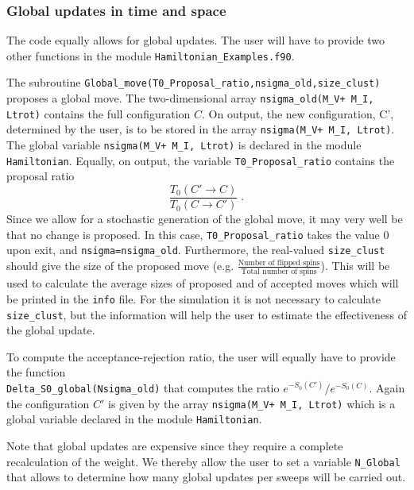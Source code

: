\subsubsection{Global updates in time and space}
%  
The code equally allows for global updates.  The user will have to provide two other functions in the module \texttt{Hamiltonian\_Examples.f90}.   


The subroutine  \texttt{Global\_move(T0\_Proposal\_ratio,nsigma\_old,size\_clust)}  proposes  a global move. 
The two-dimensional array \texttt{nsigma\_old(M\_V+ M\_I, Ltrot)}  contains  the full  configuration $C$.  On output, the new configuration,   C', determined by the user,  is to be stored in the 
array  \texttt{nsigma(M\_V+ M\_I, Ltrot)}.   The global variable \texttt{nsigma(M\_V+ M\_I, Ltrot)} is declared in the module \texttt{Hamiltonian}.  Equally, on output, the variable 
\texttt{T0\_Proposal\_ratio} contains the proposal ratio 
\begin{equation}
	 \frac{T_0(C' \rightarrow C)}{T_0(C \rightarrow C') }  \;.
\end{equation}
Since we allow for a stochastic  generation of  the global move, it may very well be that no change is proposed. In this case, \texttt{T0\_Proposal\_ratio}   takes the value 0 upon exit, and  
\texttt{nsigma=nsigma\_old}.   
Furthermore, the real-valued \texttt{size\_clust} should give the size of the proposed move (e.g. $\tfrac{\text{Number of flipped spins}}{\text{Total number of spins}}$). This will be used to calculate the average sizes of proposed and of accepted moves which will be printed in the \texttt{info} file. For the simulation it is not necessary to calculate \texttt{size\_clust}, but the information will help the user to estimate the effectiveness of the global update.


To compute the acceptance-rejection ratio,  the user  will equally have to provide the function \\
\texttt{Delta\_S0\_global(Nsigma\_old)} that computes the ratio $e^{-S_0(C')}/e^{-S_0(C)}$. Again the configuration $C'$ is   given by the array \texttt{nsigma(M\_V+ M\_I, Ltrot)}  which is 
a global variable declared in the module \texttt{Hamiltonian}.

Note that global updates are expensive since they require a complete recalculation of the weight. We thereby  allow the user to set a variable \texttt{N\_Global} that allows to  determine how many global updates per sweeps will be carried out. 
% 

